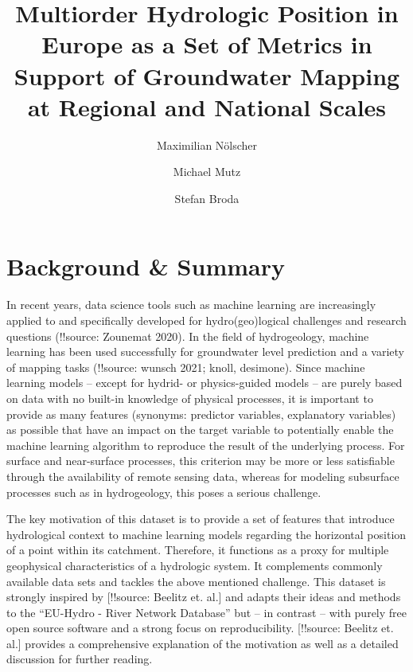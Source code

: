 \documentclass[fleqn,10pt]{wlscirep}
\title{Multiorder Hydrologic Position in Europe as a Set of Metrics in Support of Groundwater Mapping at Regional and National Scales}
\author[*, 1]{Maximilian Nölscher}
\author[2]{Michael Mutz}
\author[1]{Stefan Broda}
\affil[1]{Federal Institute for Geosciences and Natural Resources (BGR), Sub-Department: Basic information Groundwater and Soil (B2.2), Berlin, 13593, Germany}
\affil[2]{independet researcher}
\affil[*]{corresponding author: Maximilian Nölscher (max-n@posteo.de)}
\begin{document}
\flushbottom
\maketitle

\thispagestyle{empty}

\hypertarget{background-summary}{%
\section{Background \& Summary}\label{background-summary}}

In recent years, data science tools such as machine learning are increasingly applied to and specifically developed for hydro(geo)logical challenges and research questions (!!source: Zounemat 2020). In the field of hydrogeology, machine learning has been used successfully for groundwater level prediction and a variety of mapping tasks (!!source: wunsch 2021; knoll, desimone). Since machine learning models -- except for hydrid- or physics-guided models -- are purely based on data with no built-in knowledge of physical processes, it is important to provide as many features (synonyms: predictor variables, explanatory variables) as possible that have an impact on the target variable to potentially enable the machine learning algorithm to reproduce the result of the underlying process. For surface and near-surface processes, this criterion may be more or less satisfiable through the availability of remote sensing data, whereas for modeling subsurface processes such as in hydrogeology, this poses a serious challenge.

The key motivation of this dataset is to provide a set of features that introduce hydrological context to machine learning models regarding the horizontal position of a point within its catchment. Therefore, it functions as a proxy for multiple geophysical characteristics of a hydrologic system. It complements commonly available data sets and tackles the above mentioned challenge.
This dataset is strongly inspired by {[}!!source: Beelitz et. al.{]} and adapts their ideas and methods to the ``EU-Hydro - River Network Database'' but -- in contrast -- with purely free open source software and a strong focus on reproducibility. {[}!!source: Beelitz et. al.{]} provides a comprehensive explanation of the motivation as well as a detailed discussion for further reading.
\end{document}
